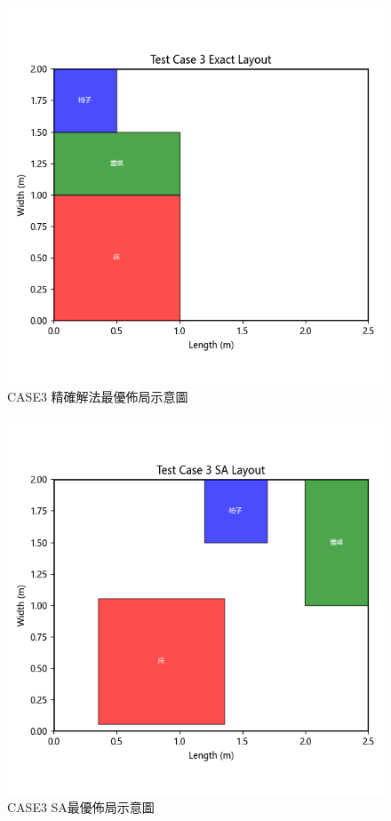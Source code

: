 \documentclass[conference]{IEEEtran}
\begin{document}
\begin{figure}[!htbp]
    \centering
    \includegraphics[width=\columnwidth]{exact_layout_test_case_3.png} 
    \caption{CASE3 精確解法最優佈局示意圖}
    \label{fig:case1_exact_solver} %
\end{figure}

\begin{figure}[!htbp]
    \centering
    \includegraphics[width=\columnwidth]{sa_layout_test_case_3.png} 
    \caption{CASE3 SA最優佈局示意圖}
    \label{fig:case1_exact_solver} %
\end{figure}
\end{document}
